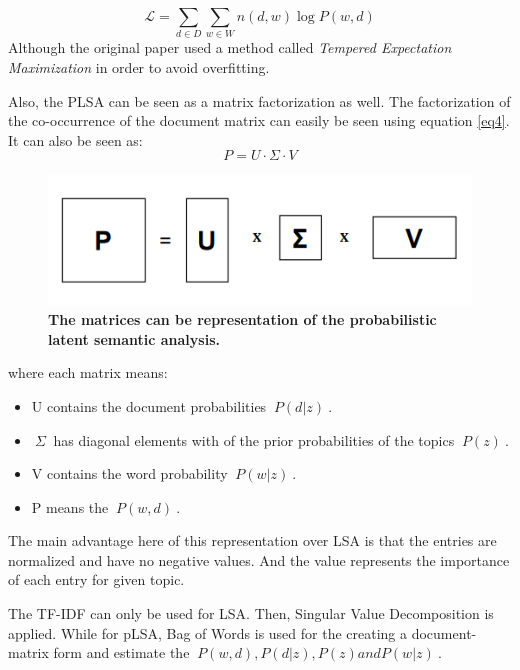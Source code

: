 \documentclass[12pt]{report}
\begin{document}
         \begin{equation}
             \mathcal{L} = \sum_{d \in D} \sum_{w \in W} n(d, w)  \log P(w, d)
         \end{equation}
        Although the original paper \cite{hofmann2013probabilistic} used a method called
        \emph{Tempered Expectation Maximization} in order to avoid overfitting.

        Also, the PLSA can be seen as a matrix factorization as well. The factorization of the co-occurrence of the
        document matrix can easily be seen using equation \ref{eq4}. It can also be seen as:
        \begin{equation}\label{eq10}
            P = U \cdot \Sigma \cdot V
        \end{equation}
        \begin{figure}[h]
            \centering
            \includegraphics[scale=0.8]{plsa.png}
            \caption{\textbf{The matrices can be representation of the probabilistic latent semantic analysis.}}
        \end{figure}
        where each matrix means:
        \begin{itemize}
            \item U contains the document probabilities $~{P(d|z)}~$.
            \item $~{\Sigma}~$ has diagonal elements with of the prior probabilities of the
            topics $~{P(z)}~$.
            \item V contains the word probability $~{P(w|z)}~$.
            \item P means the $~{P(w,d)}~$.
        \end{itemize}

        The main advantage here of this representation over LSA is that the entries are normalized and
        have no negative values. And the value represents the importance of each entry for given topic.




        The TF-IDF can only be used for LSA. Then, Singular Value Decomposition is applied.
        While for pLSA, Bag of Words is used for the creating a document-matrix form and estimate the $~{P(w, d), P(d|z), P(z) and P(w|z)}~$.
\end{document}
